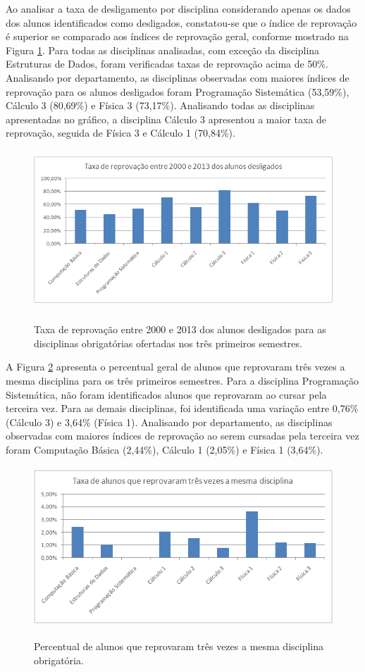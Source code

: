 Ao analisar a taxa de desligamento por disciplina considerando apenas os dados dos alunos identificados como desligados, constatou-se que o índice de reprovação é superior se comparado aos índices de reprovação geral, conforme mostrado na Figura \ref{reprovados_desligados}. Para todas as disciplinas analisadas, com exceção da disciplina Estruturas de Dados, foram verificadas taxas de reprovação acima de 50\%. Analisando por departamento, as disciplinas observadas com maiores índices de reprovação para os alunos desligados foram Programação Sistemática (53,59\%), Cálculo 3 (80,69\%) e Física 3 (73,17\%). Analisando todas as disciplinas apresentadas no gráfico, a disciplina Cálculo 3 apresentou a maior taxa de reprovação, seguida de Física 3 e Cálculo 1 (70,84\%).

\begin{figure}[!h]
	\centering
	{\includegraphics[width=13cm, height=6cm]{images/reprovados_desligados}}
	\caption {Taxa de reprovação entre 2000 e 2013 dos alunos desligados para as disciplinas obrigatórias ofertadas nos três primeiros semestres.}
	\label{reprovados_desligados}
\end{figure}

A Figura \ref{reprova3} apresenta o percentual geral de alunos que reprovaram três vezes a mesma disciplina para os três primeiros semestres. Para a disciplina Programação Sistemática, não foram identificados alunos que reprovaram ao cursar pela terceira vez. Para as demais disciplinas, foi identificada uma variação entre 0,76\% (Cálculo 3) e 3,64\% (Física 1). Analisando por departamento, as disciplinas observadas com maiores índices de reprovação ao serem cursadas pela terceira vez foram Computação Básica (2,44\%), Cálculo 1 (2,05\%) e Física 1 (3,64\%).

\begin{figure}[!h]
	\centering
	{\includegraphics[width=13cm, height=6cm]{images/reprova3}}
	\caption {Percentual de alunos que reprovaram três vezes a mesma disciplina obrigatória.}
	\label{reprova3}
\end{figure}

